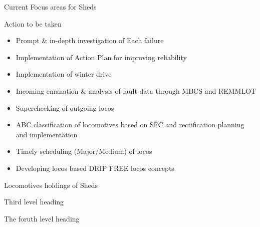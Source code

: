 \documentclass[
  ignorenonframetext,
]{beamer}
\providecommand{\tightlist}{%
  \setlength{\itemsep}{0pt}\setlength{\parskip}{0pt}}
\begin{document}
\begin{frame}{Current Focus areas for Sheds}
\protect\hypertarget{current-focus-areas-for-sheds}{}
\begin{block}{Action to be taken}
\protect\hypertarget{action-to-be-taken}{}
\begin{itemize}[<+->]
\tightlist
\item
  Prompt \& in-depth investigation of Each failure
\item
  Implementation of Action Plan for improving reliability
\item
  Implementation of winter drive
\item
  Incoming emanation \& analysis of fault data through MBCS and REMMLOT
\item
  Superchecking of outgoing locos
\item
  ABC classification of locomotives based on SFC and rectification
  planning and implementation
\item
  Timely scheduling (Major/Medium) of locos
\item
  Developing locos based DRIP FREE locos concepts
\end{itemize}

\end{block}

\begin{block}{Locomotives holdings of Sheds}
\protect\hypertarget{locomotives-holdings-of-sheds}{}

\begin{block}{Third level heading}
\protect\hypertarget{third-level-heading}{}
\begin{block}{The foruth level heading}
\protect\hypertarget{the-foruth-level-heading}{}
\end{block}
\end{block}
\end{block}
\end{frame}
\end{document}
